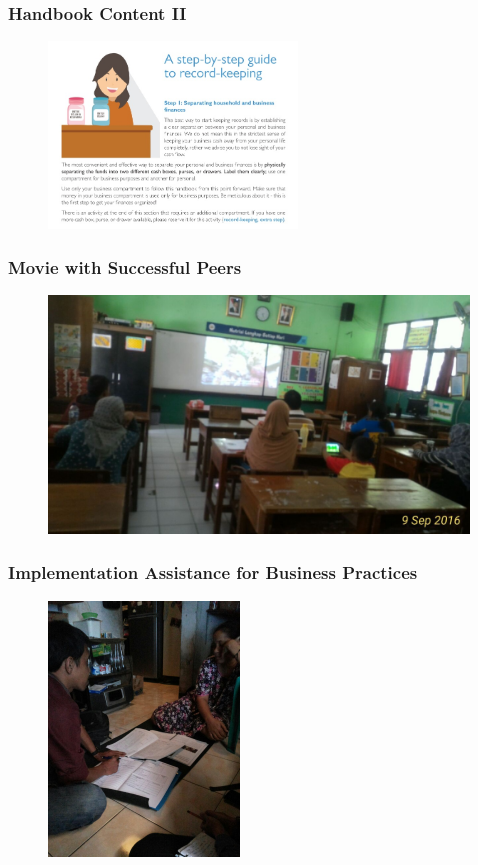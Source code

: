 \documentclass[10pt]{beamer}
\begin{document}
\begin{frame}
\frametitle{Handbook Content II}

\begin{figure}[htbp]
	\centering
		\includegraphics[width=2.6in]{pics/Handbook_stepbystep.jpg}
	
	\label{height}
\end{figure}
\end{frame}

\begin{frame}
\frametitle{Movie with Successful Peers}
\begin{figure}[htbp]
	\centering
		\includegraphics[width=4.4in]{pics/movie.jpg}
   
	\label{height}
\end{figure}
\end{frame}


\begin{frame}
\frametitle{Implementation Assistance for Business Practices}
\begin{figure}[htbp]
	\centering
		\includegraphics[width=2.0in]{pics/Assistance_expl.jpg}
	
	\label{height}
\end{figure}
\end{frame}
\end{document}
